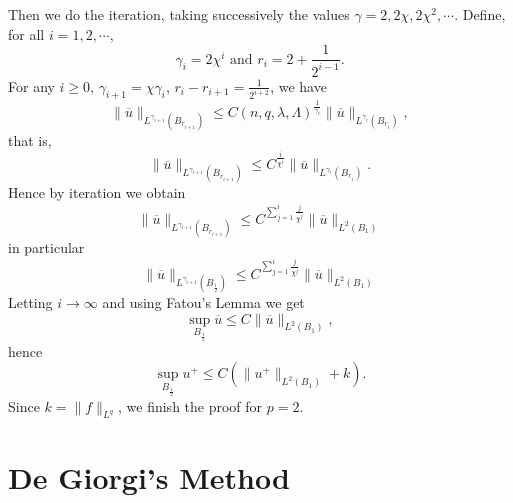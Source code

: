  Then we do the iteration, taking successively the values $\gamma=2,2\chi,2\chi^2,\cdots$. Define, for all $i=1,2,\cdots$,
 \[
 \gamma_i=2\chi^{i}\text{ and }r_i=2+\frac{1}{2^{i-1}}.
 \]
 For any $i\ge 0$, $\gamma_{i+1}=\chi\gamma_i$, $r_{i}-r_{i+1}=\frac{1}{2^{i+2}}$, we have
 \[
   \|\overline{u}\|_{L^{\gamma_{i+1}}(B_{r_{i+1}})}\le C\left( n,q,\lambda,\Lambda \right) ^{\frac{1}{\gamma_i}}\|\overline{u}\|_{L^{\gamma_i}\left( B_{r_i} \right) },
 \] 
 that is,
 \[
   \|\overline{u}\|_{L^{\gamma_{i+1}}(B_{r_{i+1}})}\le  C^{\frac{i}{\chi^{i}}}\|\overline{u}\|_{L^{\gamma_i}(B_{r_i})}.
 \] 
Hence by iteration we obtain 
\[
  \|\overline{u}\|_{L^{\gamma_{i+1}}\left( B_{r_{i+1}} \right) }\le C^{\sum_{j=1}^{i}\frac{j}{\chi^{j}}}\|\overline{u}\|_{L^{2}\left( B_1 \right) }
\] 
in particular
\[
  \|\overline{u}\|_{L^{\gamma_{i+1}}\left( B_{\frac{1}{2}} \right) }\le C^{\sum_{j=1}^{i}\frac{j}{\chi^{j}}}\|\overline{u}\|_{L^{2}\left( B_1 \right) }
\] 
Letting $i\to \infty$ and using Fatou's Lemma we get 
\[
  \sup_{B_{\frac{1}{2}}}\overline{u}\le C\|\overline{u}\|_{L^2\left( B_1 \right) },
\] 
hence
\[
  \sup_{B_{\frac{1}{2}}}u^{+}\le C\left( \|u^{+}\|_{L^2\left( B_1 \right) }+k \right). 
\] 
Since $k=\|f\|_{L^{q}}$, we finish the proof for $p=2$.
\section{De Giorgi's Method}
